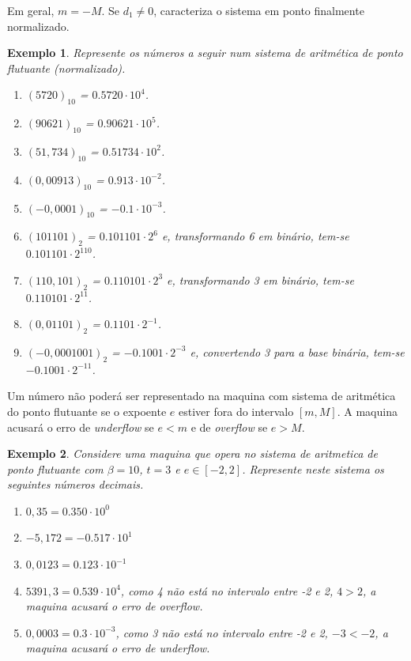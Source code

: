 \documentclass[12pt,a4paper]{book}
\newtheorem{example}{Exemplo}
\begin{document}
Em geral, $m=-M$. Se $d_1\neq 0$, caracteriza o sistema em ponto finalmente normalizado.

\begin{example}
    Represente os números a seguir num sistema de aritmética de ponto flutuante (normalizado).
    \begin{enumerate}
    	\item $(5720)_{10}$ = $0.5720\cdot 10^4$.
	    \item $(90621)_{10}$ = $0.90621\cdot 10^5$.
    	\item $(51,734)_{10}$ = $0.51734\cdot 10^2$.
	    \item $(0,00913)_{10}$ = $0.913\cdot 10^{-2}$.
    	\item $(-0,0001)_{10}$ = $-0.1\cdot 10^{-3}$.
	    \item $(101101)_{2}$ = $0.101101\cdot 2^{6}$ e, transformando 6 em binário, tem-se $0.101101\cdot 2^{110}$.
    	\item $(110,101)_{2}$ = $0.110101\cdot 2^3$ e, transformando 3 em binário, tem-se $0.110101\cdot 2^{11}$.
	    \item $(0,01101)_{2}$ = $0.1101\cdot 2^{-1}$.
    	\item $(-0,0001001)_{2}$ = $-0.1001\cdot 2^{-3}$ e, convertendo 3 para a base binária, tem-se $-0.1001\cdot 2^{-11}$.
	\end{enumerate}
\end{example}

Um número não poderá ser representado na maquina com sistema de aritmética do ponto flutuante se o expoente $e$ estiver fora do intervalo $[m, M]$. A maquina acusará o erro de \textit{underflow} se $e < m$ e de \textit{overflow} se $e>M$.

\begin{example}
    Considere uma maquina que opera no sistema de aritmetica de ponto flutuante com $\beta=10$, $t=3$ e $e\in [-2, 2]$. Represente neste sistema os seguintes números decimais.
    \begin{enumerate}
        \item $0,35 = 0.350\cdot 10^0$
        \item $-5,172 = -0.517\cdot 10^1$
        \item $0,0123 = 0.123\cdot 10^{-1}$
        \item $5391,3 = 0.539\cdot 10^4$, como 4 não está no intervalo entre -2 e 2, $4 > 2$, a maquina acusará o erro de overflow.
        \item $0,0003 = 0.3\cdot 10^{-3}$, como 3 não está no intervalo entre -2 e 2, $-3 < -2$, a maquina acusará o erro de underflow.
    \end{enumerate}
\end{example}
\end{document}
